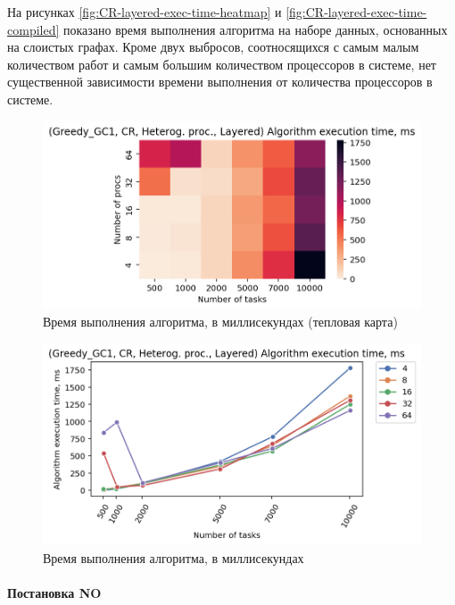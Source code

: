 На рисунках \ref{fig:CR-layered-exec-time-heatmap} и \ref{fig:CR-layered-exec-time-compiled} показано время выполнения алгоритма на наборе данных, основанных на слоистых графах. Кроме двух выбросов, соотносящихся с самым малым количеством работ и самым большим количеством процессоров в системе, нет существенной зависимости времени выполнения от количества процессоров в системе.

\begin{figure}[!htbp]
    \centering
    \includegraphics[width=\textwidth]{imgs/unbalanced/CR/et_heatmap.png}
    \caption{Время выполнения алгоритма, в миллисекундах (тепловая карта)}
    \label{fig:CR-unbalanced-exec-time-heatmap}
\end{figure}

\begin{figure}[!htbp]
    \centering
    \includegraphics[width=\textwidth]{imgs/unbalanced/CR/tr_graph.png}
    \caption{Время выполнения алгоритма, в миллисекундах}
    \label{fig:CR-unbalanced-exec-time-compiled}
\end{figure}

\paragraph{Постановка NO}


